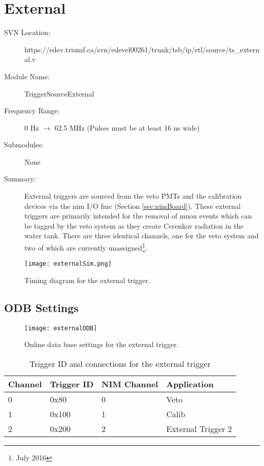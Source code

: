 \section{External}
\begin{description}
\item[SVN Location:] https://edev.triumf.ca/svn/edevel00261/trunk/tsb/ip/rtl/source/ts\_external.v
\item[Module Name: ]TriggerSourceExternal
\item[Frequency Range: ] 0 Hz $\rightarrow$ 62.5 MHz (Pulses must be at least 16 ns wide)
\item[Submodules: ]None
\item[Summary: ]External triggers are sourced from the veto PMTs and the calibration devices via the \gls{nim} I/O \gls{fmc} (Section \ref{sec:nimBoard}). These external triggers are primarily intended for the removal of muon events which can be tagged by the veto system as they create Cerenkov radiation in the water tank. There are three identical channels, one for the veto system and two of which are currently unassigned\footnote{July 2016}.
\end{description}
\begin{landscape}
	\vspace*{\fill}
	\begin{figure}[ht]
	\centering
	\texttt{[image: externalSim.png]}
	\caption{Timing diagram for the external trigger.}
	\label{Fig:}
	\end{figure}
	\vspace*{\fill}
\end{landscape}

\subsection{ODB Settings}
\label{sec:externalODB}

\begin{figure}[ht]
	\centering
	\texttt{[image: externalODB]}
	\caption{Online data base settings for the external trigger.}
	\label{Fig:externalODB}
\end{figure}


\begin{table}
	\centering
	\caption{Trigger ID and connections for the external trigger}
	\begin{tabular}{l l l l}
	Channel&	Trigger ID&		NIM Channel&	Application\\ \hline \hline	
			0&		0x80&				0&				Veto\\  
			1&		0x100&				1&				Calib\\ 
			2&		0x200&				2&				External Trigger 2\\ \hline \hline		
	\end{tabular}
\end{table}

